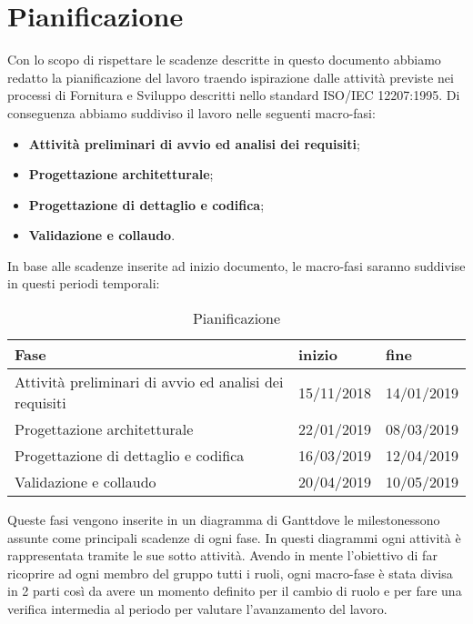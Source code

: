 \section{Pianificazione}
\label{Cap:Pianificazione}

Con lo scopo di rispettare le scadenze descritte in questo documento abbiamo redatto la pianificazione del lavoro traendo ispirazione dalle attività previste nei processi di Fornitura e Sviluppo descritti nello standard ISO/IEC 12207:1995. Di conseguenza abbiamo suddiviso il lavoro nelle seguenti macro-fasi:
\begin{itemize}
	\item{\textbf{Attività preliminari di avvio ed analisi dei requisiti}};
	\item{\textbf{Progettazione architetturale}};
	\item{\textbf{Progettazione di dettaglio e codifica}};
	\item{\textbf{Validazione e collaudo}}.
\end{itemize} 
In base alle scadenze inserite ad inizio documento, le macro-fasi saranno suddivise in questi periodi temporali:
\newline
\begin{table}[!htpb]
	\centering
	\renewcommand{\arraystretch}{2} 
	\begin{tabular}{|l|l|l|}
		\hline
		\rowcolor{orange!50}
		\textbf{Fase} & \textbf{inizio} & \textbf{fine}\\
		\hline
		Attività preliminari di avvio ed analisi dei requisiti & 15/11/2018 & 14/01/2019 \\
		\hline
		Progettazione architetturale & 22/01/2019 & 08/03/2019\\
		\hline
		Progettazione di dettaglio e codifica & 16/03/2019 & 12/04/2019\\
		\hline
		Validazione e collaudo & 20/04/2019 & 10/05/2019\\
		\hline
	\end{tabular}
	\caption{Pianificazione}
\end{table}
\newline Queste fasi vengono inserite in un diagramma di Gantt\pedice dove le milestones\pedice sono assunte come principali scadenze di ogni fase. In questi diagrammi ogni attività è rappresentata tramite le sue sotto attività.
\newline Avendo in mente l'obiettivo di far ricoprire ad ogni membro del gruppo tutti i ruoli, ogni macro-fase è stata divisa in 2 parti così da avere un momento definito per il cambio di ruolo e per fare una verifica intermedia al periodo per valutare l'avanzamento del lavoro. 


\clearpage

\clearpage

\clearpage

\clearpage
